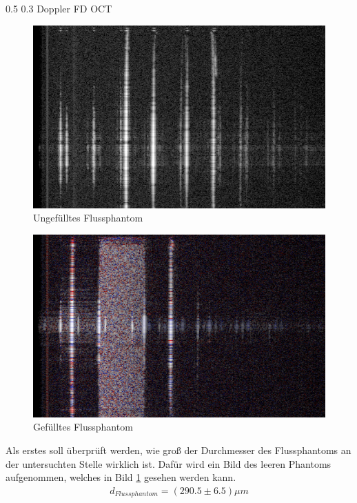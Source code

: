 \documentclass[german, %
parskip=full, %
bibliography=totoc, %
]{scrartcl}
\makeatletter
\renewcommand\subsection{\@startsection 
   {subsection}{2}{0mm}%
   {0.5\baselineskip}%
   {0.3\baselineskip}%
   {\bfseries\sffamily\large}%
   }
\makeatother
\begin{document}
\subsection{Doppler FD OCT}

\begin{figure}[ht]
	\centering
	  \includegraphics[width=\textwidth]{KapillarLuft}
	\caption{Ungefülltes Flussphantom}
	\label{fig:leerkap}
\end{figure}
\begin{figure}[ht]
  \centering
	  \includegraphics[width=\textwidth]{KapillarEmulsion}
	\caption{Gefülltes Flussphantom}
	\label{fig:fuelkap}
\end{figure}

Als erstes soll überprüft werden, wie groß der Durchmesser des Flussphantoms an der untersuchten Stelle wirklich ist. Dafür wird ein Bild des leeren Phantoms aufgenommen, welches in Bild \ref{fig:leerkap} gesehen werden kann. 
\begin{align*}
d_{Flussphantom} = (290.5 \pm 6.5) \mu m
\end{align*}
\end{document}
